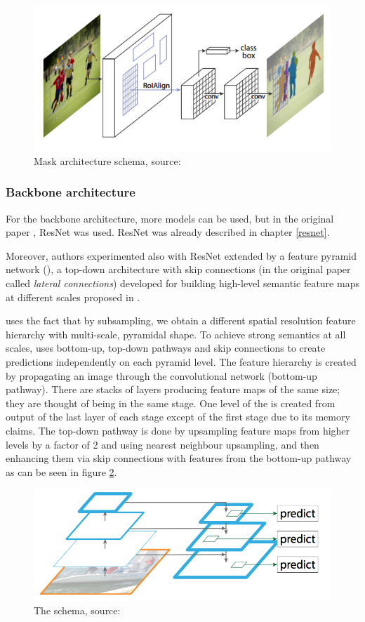 \begin{figure}[H]
   \centering
	\includegraphics[width=0.4\linewidth]{./pictures/maskrcnn.png}
	\caption[Mask R-CNN architecture]{Mask  architecture schema, source: 
\cite{mask-rcnn}}
      \label{fig:mask-rcnn}
\end{figure}

\subsubsection{Backbone architecture}
\label{backbone}

For the backbone architecture, more models can be used, but in the original 
paper \cite{mask-rcnn}, ResNet was used. ResNet was already described in chapter 
\ref{resnet}.

Moreover, authors experimented also with ResNet extended by a feature pyramid 
network (), a top-down architecture with skip connections (in the 
original paper called \textit{lateral connections}) developed for building 
high-level semantic feature maps at different scales proposed in \cite{fpn}.

 uses the fact that by subsampling, we obtain a different spatial 
resolution feature hierarchy with multi-scale, pyramidal shape. To achieve 
strong semantics at all scales,  uses bottom-up, top-down pathways and 
skip connections to create predictions independently on each pyramid level. The 
feature hierarchy is created by propagating an image through the convolutional 
network (bottom-up pathway). There are stacks of layers producing feature maps 
of the same size; they are thought of being in the same stage. One level of the 
 is created from output of the last layer of each stage except of the 
first stage due to its memory claims. The top-down pathway is done by upsampling 
feature maps from higher levels by a factor of 2 and using nearest neighbour 
upsampling, and then enhancing them via skip connections with features from the 
bottom-up pathway as can be seen in figure \ref{fig:fpn}.

\begin{figure}[H]
   \centering
	\includegraphics[width=0.4\linewidth]{./pictures/top-down.png}
	\caption[Feature pyramid network]{The  schema, source: \cite{fpn}}
      \label{fig:fpn}
\end{figure}

